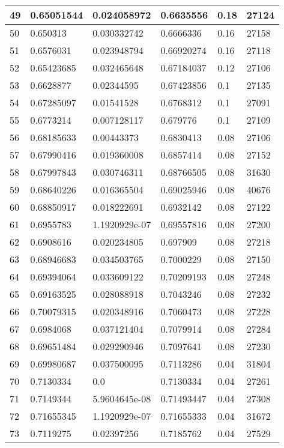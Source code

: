 \begin{longtable}{|l|l|l|l|l|l|}
49 & 0.65051544 & 0.024058972 & 0.6635556 & 0.18 & 27124 \\ \hline 
50 & 0.650313 & 0.030332742 & 0.6666336 & 0.16 & 27158 \\ \hline 
51 & 0.6576031 & 0.023948794 & 0.66920274 & 0.16 & 27118 \\ \hline 
52 & 0.65423685 & 0.032465648 & 0.67184037 & 0.12 & 27106 \\ \hline 
53 & 0.6628877 & 0.02344595 & 0.67423856 & 0.1 & 27135 \\ \hline 
54 & 0.67285097 & 0.01541528 & 0.6768312 & 0.1 & 27091 \\ \hline 
55 & 0.6773214 & 0.007128117 & 0.679776 & 0.1 & 27109 \\ \hline 
56 & 0.68185633 & 0.00443373 & 0.6830413 & 0.08 & 27106 \\ \hline 
57 & 0.67990416 & 0.019360008 & 0.6857414 & 0.08 & 27152 \\ \hline 
58 & 0.67997843 & 0.030746311 & 0.68766505 & 0.08 & 31630 \\ \hline 
59 & 0.68640226 & 0.016365504 & 0.69025946 & 0.08 & 40676 \\ \hline 
60 & 0.68850917 & 0.018222691 & 0.6932142 & 0.08 & 27122 \\ \hline 
61 & 0.6955783 & 1.1920929e-07 & 0.69557816 & 0.08 & 27200 \\ \hline 
62 & 0.6908616 & 0.020234805 & 0.697909 & 0.08 & 27218 \\ \hline 
63 & 0.68946683 & 0.034503765 & 0.7000229 & 0.08 & 27150 \\ \hline 
64 & 0.69394064 & 0.033609122 & 0.70209193 & 0.08 & 27248 \\ \hline 
65 & 0.69163525 & 0.028088918 & 0.7043246 & 0.08 & 27232 \\ \hline 
66 & 0.70079315 & 0.020348916 & 0.7060473 & 0.08 & 27228 \\ \hline 
67 & 0.6984068 & 0.037121404 & 0.7079914 & 0.08 & 27284 \\ \hline 
68 & 0.69651484 & 0.029290946 & 0.7097641 & 0.08 & 27230 \\ \hline 
69 & 0.69980687 & 0.037500095 & 0.7113286 & 0.04 & 31804 \\ \hline 
70 & 0.7130334 & 0.0 & 0.7130334 & 0.04 & 27261 \\ \hline 
71 & 0.7149344 & 5.9604645e-08 & 0.71493447 & 0.04 & 27308 \\ \hline 
72 & 0.71655345 & 1.1920929e-07 & 0.71655333 & 0.04 & 31672 \\ \hline 
73 & 0.7119275 & 0.02397256 & 0.7185762 & 0.04 & 27529 \\ \hline 

\end{longtable}
